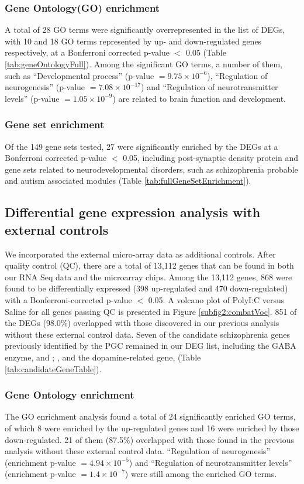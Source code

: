 \subsubsection{Gene Ontology(GO) enrichment}
A total of 28 GO terms were significantly overrepresented in the list of DEGs, with 10 and 18 GO terms represented by up- and down-regulated genes respectively, at a Bonferroni corrected p-value $<$ 0.05 (Table \ref{tab:geneOntologyFull}). 
Among the significant GO terms, a number of them, such as ``Developmental process'' (p-value $= 9.75\times 10^{-6}$), ``Regulation of neurogenesis'' (p-value $= 7.08\times 10^{-17}$) and ``Regulation of neurotransmitter levels'' (p-value $= 1.05\times 10^{-9}$) are related to brain function and development.

\subsubsection{Gene set enrichment}
Of the 149 gene sets tested, 27 were significantly enriched by the DEGs at a Bonferroni corrected p-value $<$ 0.05, including post-synaptic density protein and gene sets related to neurodevelopmental disorders, such as schizophrenia probable and autism associated modules (Table \ref{tab:fullGeneSetEnrichment}).

\subsection{Differential gene expression analysis with external controls}
We incorporated the external micro-array data as additional controls.
After quality control (QC), there are a total of 13,112 genes that can be found in both our RNA Seq data and the microarray chips.
Among the 13,112 genes, 868 were found to be differentially expressed (398 up-regulated and 470 down-regulated) with a Bonferroni-corrected p-value $<$ 0.05.
A volcano plot of PolyI:C versus Saline for all genes passing QC is presented in Figure \ref{subfig2:combatVoc}. 851 of the DEGs (98.0$\%$) overlapped with those discovered in our previous analysis without these external control data. 
Seven of the candidate schizophrenia genes previously identified by the PGC remained in our DEG list, including the GABA enzyme,  and ; ,  and the dopamine-related gene,  (Table \ref{tab:candidateGeneTable}). 

\subsubsection{Gene Ontology enrichment}
The GO enrichment analysis found a total of 24 significantly enriched GO terms, of which 8 were enriched by the up-regulated genes and 16 were enriched by those down-regulated.
21 of them (87.5$\%$) overlapped with those found in the previous analysis without these external control data. ``Regulation of neurogenesis'' (enrichment p-value $= 4.94\times10^{-5}$) and ``Regulation of neurotransmitter levels'' (enrichment p-value $= 1.4\times10^{-7}$) were still among the enriched GO terms. 
